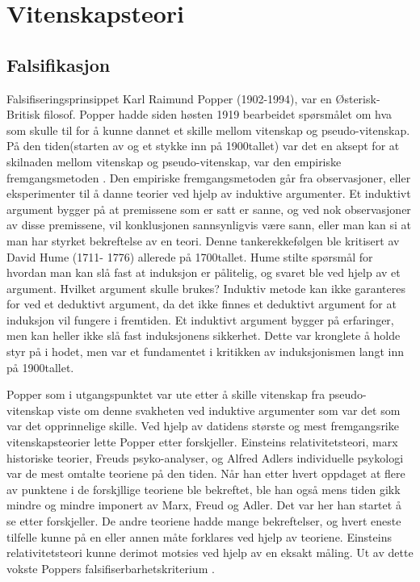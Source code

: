 \documentclass[
]{book}
\begin{document}
\hypertarget{vitenskapsteori}{%
\chapter{Vitenskapsteori}\label{vitenskapsteori}}

\hypertarget{falsifikasjon}{%
\section{Falsifikasjon}\label{falsifikasjon}}

Falsifiseringsprinsippet Karl Raimund Popper (1902-1994), var en Østerisk-Britisk filosof. Popper hadde siden høsten 1919 bearbeidet spørsmålet om hva som skulle til for å kunne dannet et skille mellom vitenskap og pseudo-vitenskap. På den tiden(starten av og et stykke inn på 1900tallet) var det en aksept for at skilnaden mellom vitenskap og pseudo-vitenskap, var den empiriske fremgangsmetoden \citep{popper2002}. Den empiriske fremgangsmetoden går fra observasjoner, eller eksperimenter til å danne teorier ved hjelp av induktive argumenter. Et induktivt argument bygger på at premissene som er satt er sanne, og ved nok observasjoner av disse premissene, vil konklusjonen sannsynligvis være sann, eller man kan si at man har styrket bekreftelse av en teori. Denne tankerekkefølgen ble kritisert av David Hume (1711- 1776) allerede på 1700tallet. Hume stilte spørsmål for hvordan man kan slå fast at induksjon er pålitelig, og svaret ble ved hjelp av et argument. Hvilket argument skulle brukes? Induktiv metode kan ikke garanteres for ved et deduktivt argument, da det ikke finnes et deduktivt argument for at induksjon vil fungere i fremtiden. Et induktivt argument bygger på erfaringer, men kan heller ikke slå fast induksjonens sikkerhet. Dette var kronglete å holde styr på i hodet, men var et fundamentet i kritikken av induksjonismen langt inn på 1900tallet.

Popper som i utgangspunktet var ute etter å skille vitenskap fra pseudo-vitenskap viste om denne svakheten ved induktive argumenter som var det som var det opprinnelige skille. Ved hjelp av datidens største og mest fremgangsrike vitenskapsteorier lette Popper etter forskjeller. Einsteins relativitetsteori, marx historiske teorier, Freuds psyko-analyser, og Alfred Adlers individuelle psykologi var de mest omtalte teoriene på den tiden. Når han etter hvert oppdaget at flere av punktene i de forskjllige teoriene ble bekreftet, ble han også mens tiden gikk mindre og mindre imponert av Marx, Freud og Adler. Det var her han startet å se etter forskjeller. De andre teoriene hadde mange bekreftelser, og hvert eneste tilfelle kunne på en eller annen måte forklares ved hjelp av teoriene. Einsteins relativitetsteori kunne derimot motsies ved hjelp av en eksakt måling. Ut av dette vokste Poppers falsifiserbarhetskriterium \citep{popper2002}.
\end{document}
